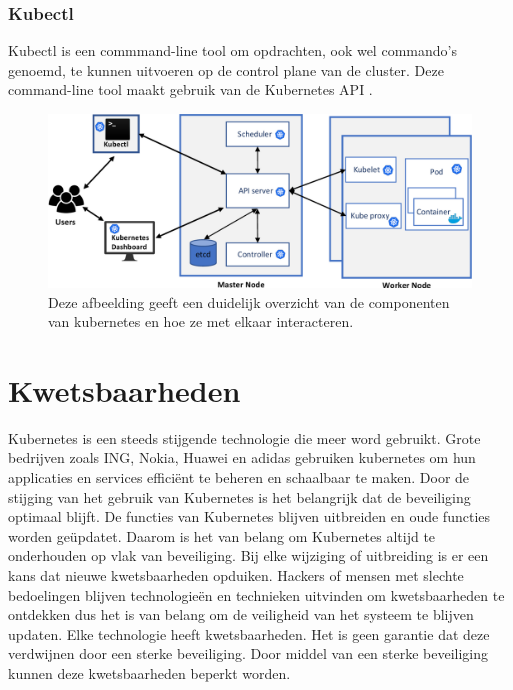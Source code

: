 \subsubsection{Kubectl}
Kubectl is een commmand-line tool om opdrachten, ook wel commando's genoemd, te kunnen uitvoeren op de control plane van de cluster.
Deze command-line tool maakt gebruik van de Kubernetes API \autocite{KubernetesDocs-2023}.

\begin{flushleft}
    \begin{figure}[h]
        \includegraphics[width=.70\textwidth]{graphics/3-Figure1-1.png}
        \caption{\label{fig:KubernetesOverview}Deze afbeelding geeft een duidelijk overzicht van de componenten van kubernetes en hoe ze met elkaar interacteren.  \autocite{shamim2020xi}}
    \end{figure} 
\end{flushleft}


\section{Kwetsbaarheden}
Kubernetes is een steeds stijgende technologie die meer word gebruikt. \autocite{KubernetesDocs-2023} Grote bedrijven zoals ING, Nokia, Huawei en adidas gebruiken kubernetes om hun applicaties en services efficiënt te beheren en schaalbaar te maken. Door de stijging van het gebruik van Kubernetes is het belangrijk dat de beveiliging optimaal blijft. De functies van Kubernetes blijven uitbreiden en oude functies worden geüpdatet. Daarom is het van belang om Kubernetes altijd te onderhouden op vlak van beveiliging. Bij elke wijziging of uitbreiding is er een kans dat nieuwe kwetsbaarheden opduiken. Hackers of mensen met slechte bedoelingen blijven technologieën en technieken uitvinden om kwetsbaarheden te ontdekken dus het is van belang om de veiligheid van het systeem te blijven updaten. Elke technologie heeft kwetsbaarheden. Het is geen garantie dat deze verdwijnen door een sterke beveiliging.
Door middel van een sterke beveiliging kunnen deze kwetsbaarheden beperkt worden.


